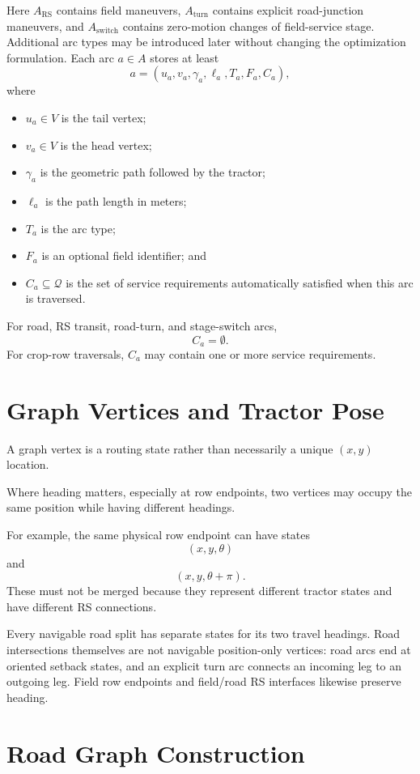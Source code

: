 \documentclass{article}
\begin{document}
Here $A_{\mathrm{RS}}$ contains field maneuvers, $A_{\mathrm{turn}}$ contains explicit road-junction maneuvers, and $A_{\mathrm{switch}}$ contains zero-motion changes of field-service stage. Additional arc types may be introduced later without changing the optimization formulation.
Each arc $a\in A$ stores at least
$$
a =
\left(
    u_a,
    v_a,
    \gamma_a,
    \ell_a,
    T_a,
    F_a,
    C_a
\right),
$$
where
\begin{itemize}
\item $u_a\in V$ is the tail vertex;
\item $v_a\in V$ is the head vertex;
\item $\gamma_a$ is the geometric path followed by the tractor;
\item $\ell_a$ is the path length in meters;
\item $T_a$ is the arc type;
\item $F_a$ is an optional field identifier; and
\item $C_a\subseteq\mathcal{Q}$ is the set of service requirements automatically satisfied when this arc is traversed.
\end{itemize}

For road, RS transit, road-turn, and stage-switch arcs,
$$
C_a=\emptyset.
$$
For crop-row traversals, $C_a$ may contain one or more service requirements.

\section{Graph Vertices and Tractor Pose}

A graph vertex is a routing state rather than necessarily a unique $(x,y)$ location.

Where heading matters, especially at row endpoints, two vertices may occupy the same position while having different headings.

For example, the same physical row endpoint can have states
$$
(x,y,\theta)
$$
and
$$
(x,y,\theta+\pi).
$$
These must not be merged because they represent different tractor states and have different RS connections.

Every navigable road split has separate states for its two travel headings. Road intersections themselves are not navigable position-only vertices: road arcs end at oriented setback states, and an explicit turn arc connects an incoming leg to an outgoing leg. Field row endpoints and field/road RS interfaces likewise preserve heading.

\section{Road Graph Construction}
\end{document}
